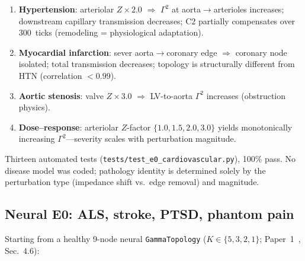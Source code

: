 \documentclass[aps,pre,twocolumn,superscriptaddress,floatfix]{revtex4-2}
\begin{document}
\begin{enumerate}
  \item \textbf{Hypertension}: arteriolar $Z \times 2.0$
    $\Rightarrow$ $\Gamma^2$ at aorta$\to$arterioles
    increases; downstream capillary transmission decreases;
    C2 partially compensates over 300~ticks
    (remodeling = physiological adaptation).
  \item \textbf{Myocardial infarction}: sever
    aorta$\to$coronary edge
    $\Rightarrow$ coronary node isolated;
    total transmission decreases; topology is structurally
    different from HTN (correlation $< 0.99$).
  \item \textbf{Aortic stenosis}: valve $Z \times 3.0$
    $\Rightarrow$ LV-to-aorta $\Gamma^2$ increases
    (obstruction physics).
  \item \textbf{Dose--response}: arteriolar $Z$-factor
    $\{1.0, 1.5, 2.0, 3.0\}$ yields monotonically
    increasing $\Gamma^2$---severity scales with perturbation
    magnitude.
\end{enumerate}

\noindent
Thirteen automated tests
(\texttt{tests/test\_e0\_cardiovascular.py}), 100\% pass.
No disease model was coded; pathology identity is
determined solely by the perturbation type
(impedance shift vs.\ edge removal) and magnitude.

\subsection{Neural E0: ALS, stroke, PTSD, phantom pain}

Starting from a healthy 9-node neural
\texttt{GammaTopology} ($K \in \{5, 3, 2, 1\}$;
Paper~1~\cite{Paper1}, Sec.~4.6):
\end{document}
